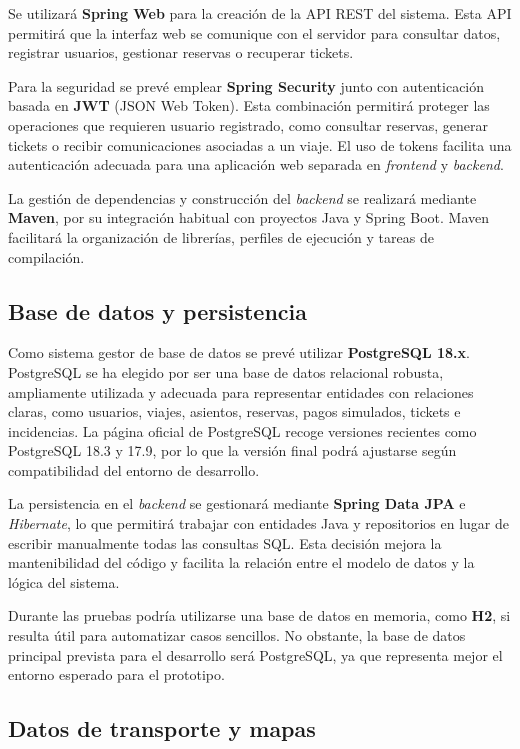 Se utilizará \textbf{Spring Web} para la creación de la API REST del sistema. Esta API permitirá que la interfaz web se comunique con el servidor para consultar datos, registrar usuarios, gestionar reservas o recuperar tickets.

Para la seguridad se prevé emplear \textbf{Spring Security} junto con autenticación basada en \textbf{JWT} (JSON Web Token). Esta combinación permitirá proteger las operaciones que requieren usuario registrado, como consultar reservas, generar tickets o recibir comunicaciones asociadas a un viaje. El uso de tokens facilita una autenticación adecuada para una aplicación web separada en \textit{frontend} y \textit{backend}.

La gestión de dependencias y construcción del \textit{backend} se realizará mediante \textbf{Maven}, por su integración habitual con proyectos Java y Spring Boot. Maven facilitará la organización de librerías, perfiles de ejecución y tareas de compilación.

\subsection{Base de datos y persistencia}

Como sistema gestor de base de datos se prevé utilizar \textbf{PostgreSQL 18.x}. PostgreSQL se ha elegido por ser una base de datos relacional robusta, ampliamente utilizada y adecuada para representar entidades con relaciones claras, como usuarios, viajes, asientos, reservas, pagos simulados, tickets e incidencias. La página oficial de PostgreSQL recoge versiones recientes como PostgreSQL 18.3 y 17.9, por lo que la versión final podrá ajustarse según compatibilidad del entorno de desarrollo.

La persistencia en el \textit{backend} se gestionará mediante \textbf{Spring Data JPA} e \textit{Hibernate}, lo que permitirá trabajar con entidades Java y repositorios en lugar de escribir manualmente todas las consultas SQL. Esta decisión mejora la mantenibilidad del código y facilita la relación entre el modelo de datos y la lógica del sistema.

Durante las pruebas podría utilizarse una base de datos en memoria, como \textbf{H2}, si resulta útil para automatizar casos sencillos. No obstante, la base de datos principal prevista para el desarrollo será PostgreSQL, ya que representa mejor el entorno esperado para el prototipo.

\subsection{Datos de transporte y mapas}

